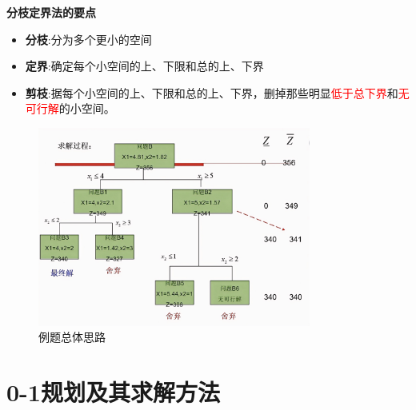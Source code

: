         \begin{notebox}{\textbf{分枝定界法的要点}}
            \begin{itemize}
                \item \textbf{分枝}:分为多个更小的空间
                \item \textbf{定界}:确定每个小空间的上、下限和总的上、下界
                \item \textbf{剪枝}:据每个小空间的上、下限和总的上、下界，删掉那些明显\textcolor{red}{低于总下界}和\textcolor{red}{无可行解}的小空间。
            \end{itemize}
        \end{notebox}
        \begin{figure}[H]
            \centering
            \includegraphics[width=0.8\textwidth]{./image/15.png}
            \caption{例题总体思路}
            \label{fig:Chapter4_Temporary_Pavilion_4}
        \end{figure}
    
    \section{0-1规划及其求解方法}

